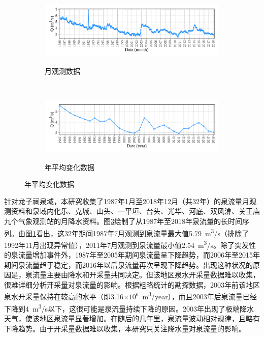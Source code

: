 \begin{figure}[!htbp]
  \centering
  \begin{subfigure}[b]{1.0\textwidth}
    \caption{月观测数据} 
    \vspace{-0.35cm}
    \includegraphics[width=\textwidth]{Img/chap4_spr/spr_discharge_monthly}
    \label{fig:spr_discharge_monthly}
  \end{subfigure}    \\
  \vspace{-1cm}
  \begin{subfigure}[b]{1.0\textwidth}
    \caption{年平均变化数据}
    \vspace{-0.35cm}
    \includegraphics[width=\textwidth]{Img/chap4_spr/spr_discharge_yearly}
    \label{fig:spr_discharge_yearly}
  \end{subfigure}
  \vspace{-2cm}
  \label{fig:spr_discharge}
\end{figure}

针对龙子祠泉域，本研究收集了1987年1月至2018年12月（共32年）的泉流量月观测资料和泉域内化乐、克城、山头、一平垣、台头、光华、河底、双风渰、关王庙九个气象观测站的月降水资料。图\ref{fig:spr_discharge}绘制了从1987年至2018年泉流量的长时间序列。由图\ref{fig:spr_discharge_monthly}看出，这32年期间1987年7月观测到泉流量最大值\SI{5.79}{m^{3}/s}（排除了1992年11月出现异常值），2011年7月观测到泉流量最小值\SI{2.54}{m^{3}/s}。除了突发性的泉流量增加事件外，1987年至2005年期间泉流量呈下降趋势，而2006年至2015年期间泉流量趋于稳定，而2016年以后泉流量再次呈现下降趋势。出现这种状况的原因是，泉流量主要由降水和开采量共同决定。但该地区泉水开采量数据难以收集，很难详细分析开采量对泉流量的影响。根据粗略统计的勘探数据，2003年前该地区泉水开采量保持在较高的水平（即3.16$\times 10^{6}$\SI{}{m^{3}/year}），而且2003年后泉流量已经下降到\SI{4}{m^{3}/s}以下，这很可能是泉流量持续下降的原因。2003年出现了极端降水天气，使该地区泉流量显著增加。在随后的几年里，泉流量波动相对规律，且略有下降趋势。由于开采量数据难以收集，本研究只关注降水量对泉流量的影响。

